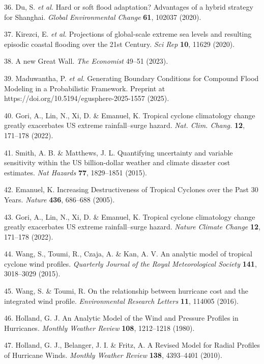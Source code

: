 \documentclass[
]{article}
\begin{document}
36. Du, S. \emph{et al.} Hard or soft flood adaptation? Advantages of a
hybrid strategy for Shanghai. \emph{Global Environmental Change}
\textbf{61}, 102037 (2020).

37. Kirezci, E. \emph{et al.} Projections of global-scale extreme sea
levels and resulting episodic coastal flooding over the 21st Century.
\emph{Sci Rep} \textbf{10}, 11629 (2020).

38. A new Great Wall. \emph{The Economist} 49--51 (2023).

39. Maduwantha, P. \emph{et al.} Generating Boundary Conditions for
Compound Flood Modeling in a Probabilistic Framework. Preprint at
https://doi.org/10.5194/egusphere-2025-1557 (2025).

40. Gori, A., Lin, N., Xi, D. \& Emanuel, K. Tropical cyclone
climatology change greatly exacerbates US extreme rainfall--surge
hazard. \emph{Nat. Clim. Chang.} \textbf{12}, 171--178 (2022).

41. Smith, A. B. \& Matthews, J. L. Quantifying uncertainty and variable
sensitivity within the US billion-dollar weather and climate disaster
cost estimates. \emph{Nat Hazards} \textbf{77}, 1829--1851 (2015).

42. Emanuel, K. Increasing Destructiveness of Tropical Cyclones over the
Past 30 Years. \emph{Nature} \textbf{436}, 686--688 (2005).

43. Gori, A., Lin, N., Xi, D. \& Emanuel, K. Tropical cyclone
climatology change greatly exacerbates US extreme rainfall--surge
hazard. \emph{Nature Climate Change} \textbf{12}, 171--178 (2022).

44. Wang, S., Toumi, R., Czaja, A. \& Kan, A. V. An analytic model of
tropical cyclone wind profiles. \emph{Quarterly Journal of the Royal
Meteorological Society} \textbf{141}, 3018--3029 (2015).

45. Wang, S. \& Toumi, R. On the relationship between hurricane cost and
the integrated wind profile. \emph{Environmental Research Letters}
\textbf{11}, 114005 (2016).

46. Holland, G. J. An Analytic Model of the Wind and Pressure Profiles
in Hurricanes. \emph{Monthly Weather Review} \textbf{108}, 1212--1218
(1980).

47. Holland, G. J., Belanger, J. I. \& Fritz, A. A Revised Model for
Radial Profiles of Hurricane Winds. \emph{Monthly Weather Review}
\textbf{138}, 4393--4401 (2010).
\end{document}

